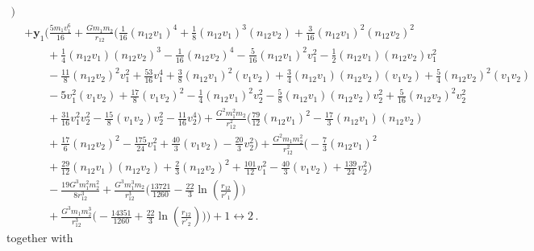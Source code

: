\documentclass[prd,preprint,superscriptaddress,tightenlines,nofootinbib,
  eqsecnum,showpacs]{revtex4}
\begin{document}
\begin{subequations}
\begin{align}
\bigg) \nonumber \\ & +  
\bm{y}_1 \bigg( \frac{5m_1 v_1^6}{16} + 
\frac{G m_1 m_2}{r_{12}}
\bigg(\frac{1}{16} (n_{12}v_1)^4 + \frac{1}{8} (n_{12}v_1)^3 (n_{12}v_2) +
\frac{3}{16} (n_{12}v_1)^2 (n_{12}v_2)^2 \nonumber \\ & \qquad  
+ \frac{1}{4}
(n_{12}v_1) (n_{12}v_2)^3 - \frac{1}{16} 
(n_{12}v_2)^4 - \frac{5}{16} (n_{12}v_1)^2 v_1^2 - \frac{1}{2} (n_{12}v_1)
(n_{12}v_2) v_1^2 \nonumber \\ & \qquad - 
\frac{11}{8} (n_{12}v_2)^2 v_1^2 + \frac{53}{16} v_1^4 + \frac{3}{8}
(n_{12}v_1)^2 (v_1v_2) + \frac{3}{4} (n_{12}v_1) (n_{12}v_2) (v_1v_2) +
\frac{5}{4} (n_{12}v_2)^2 (v_1v_2) \nonumber \\ & \qquad - 5 v_1^2 (v_1v_2) +
\frac{17}{8} 
(v_1v_2)^2 - \frac{1}{4} (n_{12}v_1)^2 v_2^2 - \frac{5}{8} (n_{12}v_1)
(n_{12}v_2) v_2^2 + \frac{5}{16} (n_{12}v_2)^2 v_2^2 \nonumber \\ & \qquad +
\frac{31}{16} v_1^2 
v_2^2 - \frac{15}{8} (v_1v_2) v_2^2 - \frac{11}{16} v_2^4\bigg) + \frac{G^2
m_1^2 m_2}{r_{12}^2} \bigg(\frac{79}{12} (n_{12}v_1)^2 - \frac{17}{3}
(n_{12}v_1) (n_{12}v_2) \nonumber \\ & \qquad + 
\frac{17}{6} (n_{12}v_2)^2 - \frac{175}{24} v_1^2 + \frac{40}{3} (v_1v_2) -
\frac{20}{3} v_2^2\bigg) + \frac{G^2 m_1 m_2^2}{r_{12}^2} 
\bigg(-\frac{7}{3} (n_{12}v_1)^2
\nonumber \\ & \qquad +
\frac{29}{12} (n_{12}v_1) (n_{12}v_2) + \frac{2}{3} (n_{12}v_2)^2 +
\frac{101}{12} v_1^2 - 
\frac{40}{3} (v_1v_2) + \frac{139}{24} v_2^2 \bigg) \nonumber 
\\ & \qquad -\frac{19 G^3 m_1^2 m_2^2}{8 r_{12}^3}+ \frac{G^3 m_1^3
m_2}{r_{12}^3} \bigg(\frac{13721}{1260}  - \frac{22}{3} \ln
\left(\frac{r_{12}}{r'_1} \right)\bigg)  \nonumber \\ & \qquad 
+ \frac{G^3 m_1 m_2^3}{r_{12}^3}
\bigg(-\frac{14351}{1260} + 
\frac{22}{3} \ln \left(\frac{r_{12}}{r'_2} \right)\bigg)\bigg) + 1
\leftrightarrow 2\,.
\end{align}
\end{subequations}
%
together with
%
\end{document}
